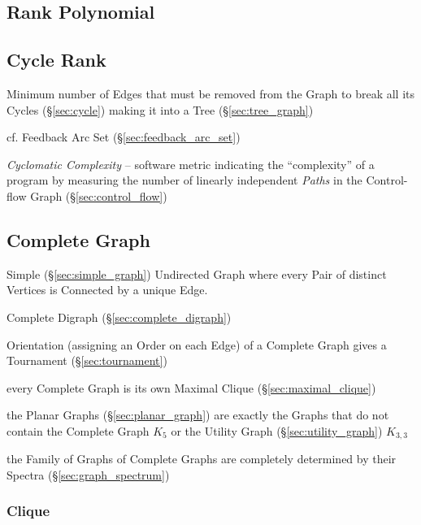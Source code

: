 \subsection{Rank Polynomial}\label{sec:rank_polynomial}



\subsection{Cycle Rank}\label{sec:cycle_rank}

Minimum number of Edges that must be removed from the Graph to break all its
Cycles (\S\ref{sec:cycle}) making it into a Tree (\S\ref{sec:tree_graph})

\fist cf. Feedback Arc Set (\S\ref{sec:feedback_arc_set})

\emph{Cyclomatic Complexity} -- software metric indicating the ``complexity''
of a program by measuring the number of linearly independent \emph{Paths} in
the Control-flow Graph (\S\ref{sec:control_flow})



\subsection{Complete Graph}\label{sec:complete_graph}

Simple (\S\ref{sec:simple_graph}) Undirected Graph where every Pair of
distinct Vertices is Connected by a unique Edge.

Complete Digraph (\S\ref{sec:complete_digraph})

Orientation (assigning an Order on each Edge) of a Complete Graph
gives a Tournament (\S\ref{sec:tournament})

every Complete Graph is its own Maximal Clique (\S\ref{sec:maximal_clique})

the Planar Graphs (\S\ref{sec:planar_graph}) are exactly the Graphs that do not
contain the Complete Graph $K_5$ or the Utility Graph
(\S\ref{sec:utility_graph}) $K_{3,3}$

the Family of Graphs of Complete Graphs are completely determined by their
Spectra (\S\ref{sec:graph_spectrum})



\subsubsection{Clique}\label{sec:clique}

